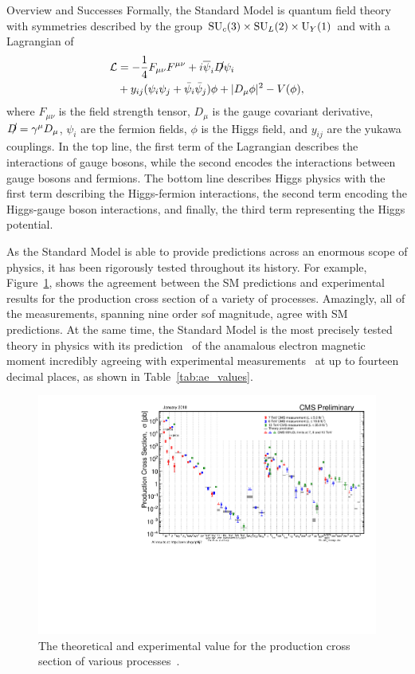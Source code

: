\begin{section}{Overview and Successes}
Formally, the Standard Model is quantum field theory with symmetries described by the group $\mathrm{SU}_c(3) \times \mathrm{SU}_L(2) \times \mathrm{U}_Y(1)$ and with a Lagrangian of
\begin{align}
\mathcal{L} &= -\frac{1}{4}F_{\mu\nu}F^{\mu\nu} + i\overline{\psi}_i\slashed{D}\psi_i \nonumber \\
            &+ y_{ij}(\psi_{i}\psi_{j}+\bar{\psi}_{i}\bar{\psi}_{j})\phi + |D_{\mu}\phi|^2 - V(\phi),
\end{align}
where $F_{\mu\nu}$ is the field strength tensor, $D_{\mu}$ is the gauge covariant derivative, $\slashed{D} = \gamma^{\mu}D_{\mu}$, $\psi_{i}$ are the fermion fields, $\phi$ is the Higgs field, and $y_{ij}$ are the yukawa couplings.
In the top line, the first term of the Lagrangian describes the interactions of gauge bosons, while the second encodes the interactions between gauge bosons and fermions.
The bottom line describes Higgs physics with the first term describing the Higgs-fermion interactions, the second term encoding the Higgs-gauge boson interactions, and finally, the third term representing the Higgs potential.

As the Standard Model is able to provide predictions across an enormous scope of physics, it has been rigorously tested throughout its history.
For example, Figure~\ref{fig:sm_tests}, shows the agreement between the SM predictions and experimental results for the production cross section of a variety of processes.
Amazingly, all of the measurements, spanning nine order sof magnitude, agree with SM predictions.
At the same time, the Standard Model is the most precisely tested theory in physics with its prediction~\cite{PhysRevLett.109.111807} of the anamalous electron magnetic moment incredibly agreeing with experimental measurements~\cite{PhysRevLett.100.120801,PhysRevA.83.052122} at up to fourteen decimal places, as shown in Table~\ref{tab:ae_values}.

\begin{figure}[tbp!]
\begin{center}
\includegraphics[angle=0,width=0.95\columnwidth]{fig/sm_tests.pdf}
\end{center}
\caption{The theoretical and experimental value for the production cross section of various processes~\cite{sm_tests}.}
\label{fig:sm_tests}
\end{figure}


\end{section}
